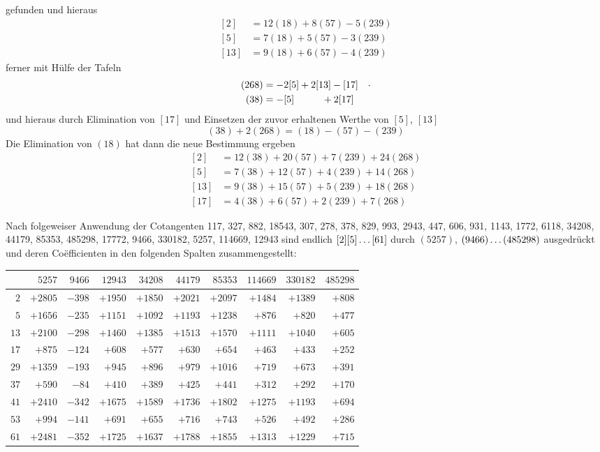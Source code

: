 gefunden und hieraus
\[
\begin{aligned}
[2]&=12(18)+8(57)-5(239)\\
{}[5]&=7(18)+5(57)-3(239)\\
{}[13]&=9(18)+6(57)-4(239)
\end{aligned}
\]
ferner mit Hülfe der Tafeln
\[
\begin{aligned}
(268)&=-2[5]+2[13]-[17]\quad\raisebox{.4ex}{$\pdot$}\\
(38)&=-[5]\phantom{+2[13]}+2[17]
\end{aligned}
\]
und hieraus durch Elimination von $[17]$ und Einsetzen der zuvor erhaltenen Werthe von $[5]$, $[13]$
\[
(38)+2(268)=(18)-(57)-(239)
\]
Die Elimination von $(18)$ hat dann die neue Bestimmung ergeben
\[
\begin{aligned}
[2]&=12(38)+20(57)+7(239)+24(268)\\
{}[5]&=7(38)+12(57)+4(239)+14(268)\\
{}[13]&=9(38)+15(57)+5(239)+18(268)\\
{}[17]&=4(38)+6(57)+2(239)+7(268)
\end{aligned}
\]
\par Nach folgeweiser Anwendung der Cotangenten 117, 327, 882, 18543, 307, 278, 378, 829, 993, 2943, 447, 606, 931, 1143, 1772, 6118, 34208, 44179, 85353, 485298, 17772, 9466, 330182, 5257, 114669, 12943 sind endlich $[2][5]\mathinner{.\,.\,.}[61]$ durch $(5257)$, $(9466)\mathinner{.\,.\,.}(485298)$ ausgedrückt und deren Coëfficienten in den folgenden Spalten zusammengestellt:
\begingroup\fontsize{9.5}{12}\selectfont\setlength{\tabcolsep}{2.3pt}
\begin{center}
\begin{tabular}{r|r|r|r|r|r|r|r|r|r}
 & $5257$ & $9466$ & $12943$ & $34208$ & $44179$ & $85353$ & $114669$ & $330182$ & $485298$ \\\hline
$2$ & $+2805$ & $-398$ & $+1950$ & $+1850$ & $+2021$ & $+2097$ & $+1484$ & $+1389$ & $+808$ \\
$5$ & $+1656$ & $-235$ & $+1151$ & $+1092$ & $+1193$ & $+1238$ & $+876$ & $+820$ & $+477$ \\
$13$ & $+2100$ & $-298$ & $+1460$ & $+1385$ & $+1513$ & $+1570$ & $+1111$ & $+1040$ & $+605$ \\
$17$ & $+875$ & $-124$ & $+608$ & $+577$ & $+630$ & $+654$ & $+463$ & $+433$ & $+252$ \\
$29$ & $+1359$ & $-193$ & $+945$ & $+896$ & $+979$ & $+1016$ & $+719$ & $+673$ & $+391$ \\
$37$ & $+590$ & $-84$ & $+410$ & $+389$ & $+425$ & $+441$ & $+312$ & $+292$ & $+170$ \\
$41$ & $+2410$ & $-342$ & $+1675$ & $+1589$ & $+1736$ & $+1802$ & $+1275$ & $+1193$ & $+694$ \\
$53$ & $+994$ & $-141$ & $+691$ & $+655$ & $+716$ & $+743$ & $+526$ & $+492$ & $+286$ \\
$61$ & $+2481$ & $-352$ & $+1725$ & $+1637$ & $+1788$ & $+1855$ & $+1313$ & $+1229$ & $+715$ \\
\end{tabular}
\end{center}\endgroup
